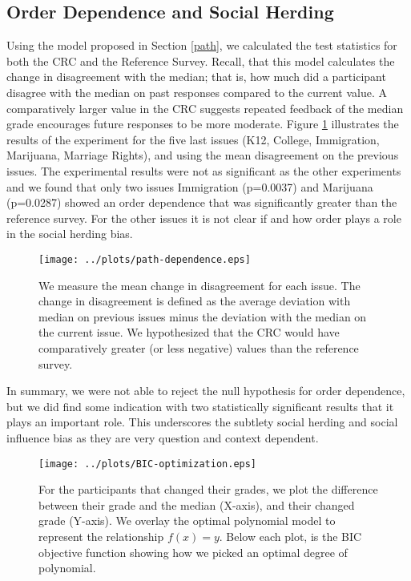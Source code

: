 \subsection{Order Dependence and Social Herding}
Using the model proposed in Section \ref{path}, we calculated the test statistics for both the CRC and the Reference Survey.
Recall, that this model calculates the change in disagreement with the median; that is, how much did a participant disagree with the median on past responses compared 
to the current value.
A comparatively larger value in the CRC suggests repeated feedback of the median grade encourages future responses to be more moderate.
Figure \ref{path-1} illustrates the results of the experiment for the five last issues (K12, College, Immigration, Marijuana, Marriage Rights), and using the mean disagreement on the previous issues.
The experimental results were not as significant as the other experiments and we found that only two issues Immigration (p=0.0037) and Marijuana (p=0.0287) showed an order dependence that was significantly greater than the reference survey.
For the other issues it is not clear if and how order plays a role in the social herding bias.
\begin{figure}[h]
  \centering
    \texttt{[image: ../plots/path-dependence.eps]}
      \caption{We measure the mean change in disagreement for each issue. The change in disagreement is defined as the average deviation with median on previous issues minus the deviation with the median on the current issue. We hypothesized that the CRC would have comparatively greater (or less negative) values than the reference survey.}
      \label{path-1}
\end{figure}
In summary, we were not able to reject the null hypothesis for order dependence, but we did find some indication with two statistically significant results that it plays an important role.
This underscores the subtlety social herding and social influence bias as they are very question and context dependent.

\begin{figure*}[ht!]
\hspace{-7em}
    \texttt{[image: ../plots/BIC-optimization.eps]}
      \caption{For the participants that changed their grades, we plot the difference between their grade and the median (X-axis), and their changed grade (Y-axis). We overlay the optimal polynomial model to represent the relationship $f(x) = y$. Below each plot, is the BIC objective function showing how we picked an optimal degree of polynomial.}
      \label{opt-1}
\end{figure*}


